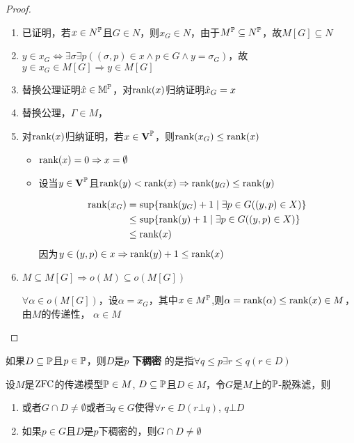\documentclass[11pt]{article}
\begin{document}
\begin{proof}
\begin{enumerate}
\item 已证明，若\(x\in N^{\P}\)且\(G\in N\)，则\(x_G\in N\)，由于\(M^{\P}\subseteq N^{\P}\)，故\(M[G]\subseteq N\)
\item \(y\in x_G\Leftrightarrow\exists\sigma\exists p((\sigma,p)\in x\wedge p\in G\wedge y=\sigma_G)\)，故\(y\in x_G\in M[G]\Rightarrow y\in M[G]\)
\item 替换公理证明\(\hatx\in\M^{\P}\)，对\(\rank(x)\)归纳证明\(\hatx_G=x\)
\item 替换公理，\(\Gamma\in M\)，
\item 对\(\rank(x)\)归纳证明，若\(x\in\bV^{\P}\)，则\(\rank(x_G)\le\rank(x)\)
\begin{itemize}
\item \(\rank(x)=0\Rightarrow x=\emptyset\)
\item 设当\(y\in\bV^{\P}\)且\(\rank(y)<\rank(x)\Rightarrow\rank(y_G)\le\rank(y)\)

\begin{align*}
\rank(x_G)&=\sup\{\rank(y_G)+1\mid\exists p\in G((y,p)\in X)\}\\
&\le\sup\{\rank(y)+1\mid\exists p\in G((y,p)\in X)\}\\
&\le\rank(x)
\end{align*}
因为\(y\in(y,p)\in x\Rightarrow\rank(y)+1\le\rank(x)\)
\end{itemize}
\item \(M\subseteq M[G]\Rightarrow o(M)\subseteq o(M[G])\)

\(\forall\alpha\in o(M[G])\)，设\(\alpha=x_G\)，其中\(x\in M^{\P}\),则\(\alpha=\rank(\alpha)\le\rank(x)\in M\)，由\(M\)的传递性，
\(\alpha\in M\)
\end{enumerate}
\end{proof}

\begin{definition}[]
如果\(D\subseteq\P\)且\(p\in\P\)，则\(D\)是\(p\) \textbf{下稠密} 的是指\(\forall q\le p\exists r\le q(r\in D)\)
\end{definition}

\begin{proposition}[]
设\(M\)是\(\ZFC\)的传递模型\(\P\in M\), \(D\subseteq\P\)且\(D\in M\)，令\(G\)是\(M\)上的\(\P\)-脱殊滤，则
\begin{enumerate}
\item 或者\(G\cap D\neq\emptyset\)或者\(\exists q\in G\)使得\(\forall r\in D(r\bot q)\), \(q\bot D\)
\item 如果\(p\in G\)且\(D\)是\(p\)下稠密的，则\(G\cap D\neq\emptyset\)
\end{enumerate}
\end{proposition}
\end{document}
